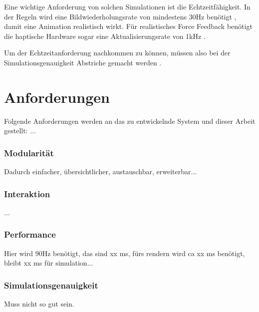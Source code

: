 
Eine wichtige Anforderung von solchen Simulationen ist die Echtzeitfähigkeit. In der Regeln wird eine Bildwiederholungsrate von mindestens 30Hz benötigt %
, damit eine Animation realistisch wirkt. %
Für realistisches Force Feedback benötigt die haptische Hardware sogar eine Aktualisierungsrate von 1kHz \cite{SimUpdate}. 

Um der Echtzeitanforderung nachkommen zu können, müssen also bei der Simulationsgenauigkeit Abstriche gemacht werden \cite{SimUpdate}.


\section{Anforderungen}
\label{sec_Anforderungen}
Folgende Anforderungen werden an das zu entwickelnde System und dieser Arbeit gestellt: ...

\subsubsection{Modularität}

Dadurch einfacher, übersichtlicher, austauschbar, erweiterbar...

\subsubsection{Interaktion}
...

\subsubsection{Performance}
Hier wird 90Hz benötigt, das sind xx ms, fürs rendern wird ca xx ms benötigt, bleibt xx ms für simulation...

\subsubsection{Simulationsgenauigkeit}
Muss nicht so gut sein.

